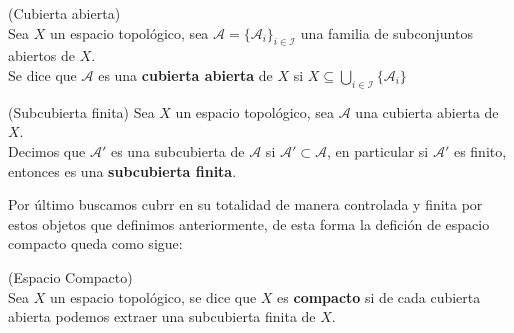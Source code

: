 \begin{definition}(Cubierta abierta)
    \\Sea $X$ un espacio topológico, sea $\mathcal{A} = \{\mathcal{A}_i\}_{i \in \mathcal{I}}$ una familia de subconjuntos abiertos de $X$.
    \\Se dice que $\mathcal{A}$ es una \textbf{cubierta abierta} de $X$ si $X \subseteq \displaystyle \bigcup_{i \in \mathcal{I}} \{\mathcal{A}_i\} $
    
\end{definition}

\begin{definition}(Subcubierta finita)
    Sea $X$ un espacio topológico, sea $\mathcal{A}$ una cubierta abierta de $X$. 
    \\Decimos que $\mathcal{A}'$ es una subcubierta de $\mathcal{A}$ si $\mathcal{A}' \subset \mathcal{A}$, en particular si $\mathcal{A}'$ es finito, entonces es una \textbf{subcubierta finita}.
    
\end{definition}
Por último buscamos cubrr en su totalidad de manera controlada y finita por estos objetos que definimos anteriormente, de esta forma la defición de espacio compacto queda como sigue:

\begin{definition}(Espacio Compacto)
    \\Sea $X$ un espacio topológico, se dice que $X$ es \textbf{compacto} si de cada cubierta abierta podemos extraer una subcubierta finita de $X$.
\end{definition}

